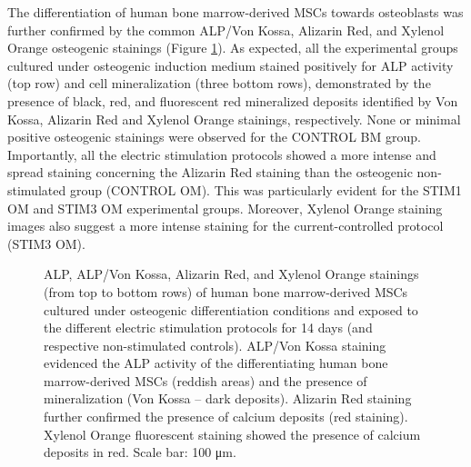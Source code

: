 The differentiation of human bone marrow-derived \ac{MSCs} towards osteoblasts was further confirmed by the common ALP/Von Kossa, Alizarin Red, and Xylenol Orange osteogenic stainings (Figure \ref{fig4d9}). As expected, all the experimental groups cultured under osteogenic induction medium stained positively for \ac{ALP} activity (top row) and cell mineralization (three bottom rows), demonstrated by the presence of black, red, and fluorescent red mineralized deposits identified by Von Kossa, Alizarin Red and Xylenol Orange stainings, respectively. None or minimal positive osteogenic stainings were observed for the CONTROL BM group. Importantly, all the electric stimulation protocols showed a more intense and spread staining concerning the Alizarin Red staining than the osteogenic non-stimulated group (CONTROL OM). This was particularly evident for the STIM1 OM and STIM3 OM experimental groups. Moreover, Xylenol Orange staining images also suggest a more intense staining for the current-controlled protocol (STIM3 OM).

\begin{figure}
\caption{ALP, ALP/Von Kossa, Alizarin Red, and Xylenol Orange stainings (from top to bottom rows) of human bone marrow-derived \ac{MSCs} cultured under osteogenic differentiation conditions and exposed to the different electric stimulation protocols for 14 days (and respective non-stimulated controls). \acs{ALP}/Von Kossa staining evidenced the \ac{ALP} activity of the differentiating human bone marrow-derived \ac{MSCs} (reddish areas) and the presence of mineralization (Von Kossa – dark deposits). Alizarin Red staining further confirmed the presence of calcium deposits (red staining). Xylenol Orange fluorescent staining showed the presence of calcium deposits in red. Scale bar: 100 \si{\micro\meter}.}
\label{fig4d9}
\end{figure}   


